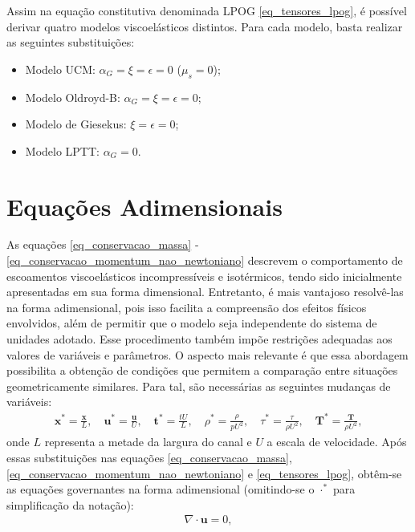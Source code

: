 Assim na equação constitutiva denominada LPOG \eqref{eq_tensores_lpog}, é possível derivar quatro modelos viscoelásticos distintos. Para cada modelo, basta realizar as seguintes substituições:
\begin{itemize}
    \item Modelo UCM: $\alpha_G = \xi = \epsilon = 0$ ($\mu_s = 0$); 
    \item Modelo Oldroyd-B: $\alpha_G = \xi = \epsilon = 0$;
    \item Modelo de Giesekus: $\xi = \epsilon = 0$;
    \item Modelo LPTT: $\alpha_G = 0$.
\end{itemize}

\section{Equações Adimensionais}\label{Sec:Adimensionalizacao}
As equações \eqref{eq_conservacao_massa} - \eqref{eq_conservacao_momentum_nao_newtoniano} descrevem o comportamento de escoamentos viscoelásticos incompressíveis e isotérmicos, tendo sido inicialmente apresentadas em sua forma dimensional. Entretanto, é mais vantajoso resolvê-las na forma adimensional, pois isso facilita a compreensão dos efeitos físicos envolvidos, além de permitir que o modelo seja independente do sistema de unidades adotado. Esse procedimento também impõe restrições adequadas aos valores de variáveis e parâmetros. O aspecto mais relevante é que essa abordagem possibilita a obtenção de condições que permitem a comparação entre situações geometricamente similares. Para tal, são necessárias as seguintes mudanças de variáveis:
\begin{align*}
    \mathbf{x}^*=\frac{\mathbf{x}}{L},\quad \mathbf{u}^*=\frac{\mathbf{u}}{U},\quad \mathbf{t}^*=\frac{t U}{L},\quad \rho^*=\frac{\rho}{p U^2},\quad \tau^*=\frac{\tau}{\rho U^2},\quad \mathbf{T}^*=\frac{\mathbf{T}}{\rho U^2},
\end{align*}
onde $L$ representa a metade da largura do canal e $U$ a escala de velocidade. Após essas substituições nas equações \eqref{eq_conservacao_massa}, \eqref{eq_conservacao_momentum_nao_newtoniano} e \eqref{eq_tensores_lpog}, obtêm-se as equações governantes na forma adimensional (omitindo-se o $\cdot^{*}$ para simplificação da notação):
\begin{equation}
    \begin{split}
        \nabla \cdot \mathbf{u} = 0,
    \end{split}\label{eq_conservacao_massa_admensional}
\end{equation}
